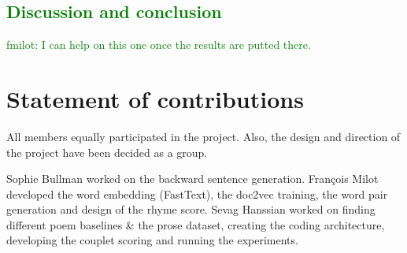 \documentclass[11pt,a4paper]{article}
\begin{document}
\textcolor{green}{
\section{Discussion and conclusion}
\label{sec:discconc}
fmilot: I can help on this one once the results are putted there.
}


\section{Statement of contributions}
\label{sec:contributions}
All members equally participated in the project. Also, the design and direction of the project have been decided as a group. 

Sophie Bullman worked on the backward sentence generation. François Milot developed the word embedding (FastText), the doc2vec training, the word pair generation and design of the rhyme score. Sevag Hanssian worked on finding different poem baselines \& the prose dataset, creating the coding architecture, developing the couplet scoring and running the experiments.



\end{document}
